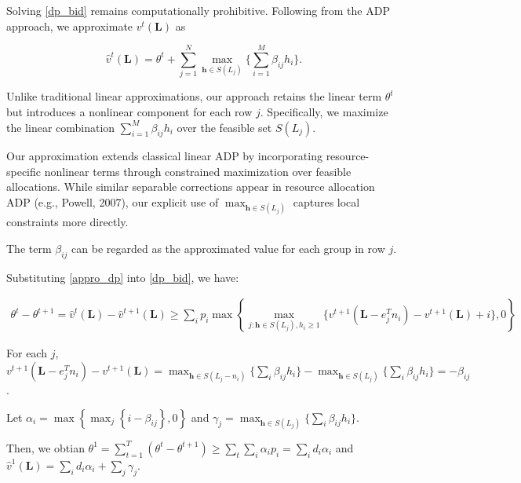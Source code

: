 Solving \eqref{dp_bid} remains computationally prohibitive. Following from the ADP approach, we approximate $v^{t}(\bm{L})$ as 

\begin{equation}\label{appro_dp}
    \hat{v}^{t}(\bm{L}) = \theta^{t} + \sum_{j=1}^{N} \max_{\bm{h} \in S(L_{j})} \{\sum_{i=1}^{M} \beta_{ij} h_{i}\}.
\end{equation}

Unlike traditional linear approximations, our approach retains the linear term $\theta^{t}$ but introduces a nonlinear component for each row $j$. Specifically, we maximize the linear combination $\sum_{i=1}^{M} \beta_{ij} h_{i}$ over the feasible set $S(L_{j})$.

Our approximation extends classical linear ADP by incorporating resource-specific nonlinear terms through constrained maximization over feasible allocations. While similar separable corrections appear in resource allocation ADP (e.g., Powell, 2007), our explicit use of $\max_{\bm{h} \in S(L_j)}$ captures local constraints more directly.



The term $\beta_{ij}$ can be regarded as the approximated value for each group in row $j$. 

Substituting \eqref{appro_dp} into \eqref{dp_bid}, we have:

\begin{align}
    \theta^{t} - \theta^{t+1} = \hat{v}^{t}(\bm{L}) - \hat{v}^{t+1}(\bm{L}) \geq  \sum_{i} p_{i} \max\left\{\max_{j:\bm{h} \in S(L_{j}), h_{i} \geqslant 1}\{v^{t+1}(\bm{L} - e_{j}^{T} n_{i}) - v^{t+1}(\bm{L}) + i\}, 0\right\}
\end{align}

For each $j$, $v^{t+1}(\bm{L} - e_{j}^{T} n_{i}) - v^{t+1}(\bm{L}) = \max_{\bm{h} \in S(L_{j}- n_{i})} \{\sum_{i} \beta_{ij} h_{i}\} - \max_{\bm{h} \in S(L_{j})} \{\sum_{i} \beta_{ij} h_{i}\} = -\beta_{ij}$.

Let $\alpha_{i} = \max\left\{\max_{j}\left\{i - \beta_{ij} \right\}, 0\right\}$ and $\gamma_{j} = \max_{\bm{h} \in S(L_{j})} \{\sum_{i} \beta_{ij} h_{i}\}$.
 
Then, we obtian $\theta^{1} = \sum_{t=1}^{T} (\theta^{t} - \theta^{t+1}) \geq \sum_{t} \sum_{i} \alpha_{i} p_{i} = \sum_{i} d_{i} \alpha_{i}$ and $\hat{v}^{1}(\bm{L}) = \sum_{i} d_{i} \alpha_{i} + \sum_{j} \gamma_{j}$.

